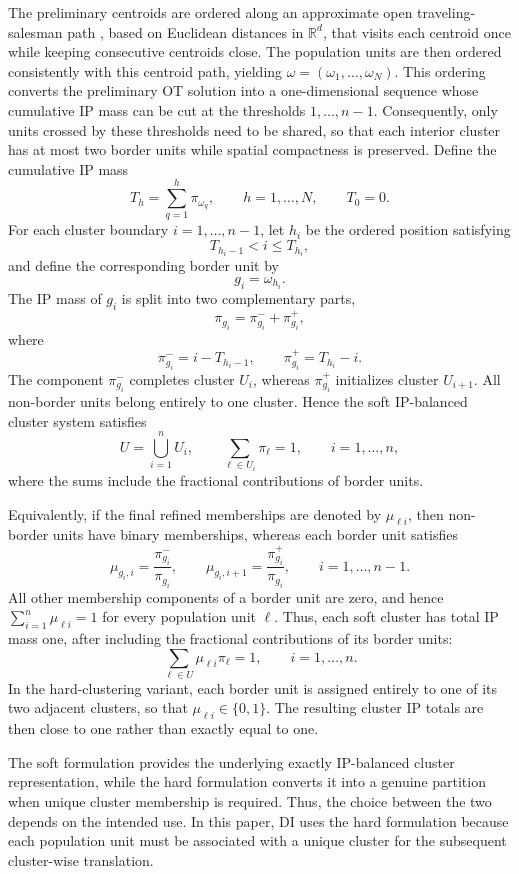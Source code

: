 \documentclass[12pt]{imsart}
\theoremstyle{plain}
\theoremstyle{remark}
\begin{document}
The preliminary centroids are ordered along an approximate open
traveling-salesman path \citep{lawler1985traveling}, based on Euclidean distances in
\(\mathbb{R}^d\), that visits each centroid once while keeping consecutive
centroids close. The population units are then
ordered consistently with this centroid path, yielding
\(\omega=(\omega_1,\ldots,\omega_N)\). This ordering converts the preliminary
OT solution into a one-dimensional sequence whose cumulative IP mass can be
cut at the thresholds \(1,\ldots,n-1\). Consequently, only units crossed by
these thresholds need to be shared, so that each interior cluster has at most
two border units while spatial compactness is preserved. Define the
cumulative IP mass
\[
T_h=\sum_{q=1}^{h}\pi_{\omega_q},
\qquad h=1,\ldots,N,
\qquad T_0=0 .
\]
For each cluster boundary \(i=1,\ldots,n-1\), let \(h_i\) be the ordered
position satisfying
\[
T_{h_i-1}< i \leq T_{h_i},
\]
and define the corresponding border unit by
\[
g_i=\omega_{h_i}.
\]
The IP mass of \(g_i\) is split into two complementary parts,
\[
\pi_{g_i}=\pi^{-}_{g_i}+\pi^{+}_{g_i},
\]
where
\[
\pi^{-}_{g_i}=i-T_{h_i-1},
\qquad
\pi^{+}_{g_i}=T_{h_i}-i .
\]
The component \(\pi^{-}_{g_i}\) completes cluster \(U_i\), whereas
\(\pi^{+}_{g_i}\) initializes cluster \(U_{i+1}\). All non-border units belong
entirely to one cluster. Hence the soft IP-balanced cluster system satisfies
\[
U=\bigcup_{i=1}^{n}U_i,
\qquad
\sum_{\ell\in U_i}\pi_\ell=1,
\qquad i=1,\ldots,n,
\]
where the sums include the fractional contributions of border units.

 Equivalently, if the final refined memberships are denoted by
\(\mu_{\ell i}\), then non-border units have binary memberships, whereas each
border unit satisfies
\[
\mu_{g_i,i}=\frac{\pi^{-}_{g_i}}{\pi_{g_i}},
\qquad
\mu_{g_i,i+1}=\frac{\pi^{+}_{g_i}}{\pi_{g_i}},
\qquad i=1,\ldots,n-1 .
\]
All other membership components of a border unit are zero, and hence
\(\sum_{i=1}^n \mu_{\ell i}=1\) for every population unit \(\ell\).
Thus, each soft cluster has total IP mass one, after including the fractional
contributions of its border units:
\[
\sum_{\ell\in U}\mu_{\ell i}\pi_\ell=1,
\qquad i=1,\ldots,n .
\]
In the hard-clustering variant, each border unit is assigned entirely to one
of its two adjacent clusters, so that \(\mu_{\ell i}\in\{0,1\}\). The resulting
cluster IP totals are then close to one rather than exactly equal to one.

The soft formulation provides the underlying exactly
IP-balanced cluster representation, while the hard formulation converts it
into a genuine partition when unique cluster membership is required. Thus,
the choice between the two depends on the intended use. In this paper, DI
uses the hard formulation because each population unit must be associated
with a unique cluster for the subsequent cluster-wise translation.
\end{document}
